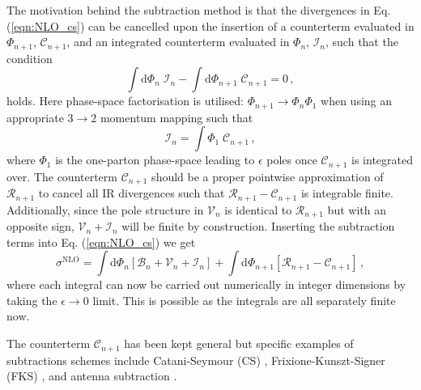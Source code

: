 \documentclass[main.tex]{subfiles}
\begin{document}
    The motivation behind the subtraction method is that the
    divergences in Eq. (\ref{eqn:NLO_cs}) can be cancelled upon the insertion
    of a counterterm evaluated in $\Phi_{n+1}$, $\mathcal{C}_{n+1}$,
    and an integrated counterterm evaluated in $\Phi_{n}$, $\mathcal{I}_{n}$,
    such that the condition
    \begin{equation}\label{eqn:subtraction_term_condition}
        \int \mathrm{d}\Phi_{n} \; \mathcal{I}_{n} - \int \mathrm{d}\Phi_{n+1} \; \mathcal{C}_{n+1} = 0 \, ,
    \end{equation}
    holds. Here phase-space factorisation is utilised:
    $\Phi_{n+1} \rightarrow \Phi_{n}\Phi_{1}$ when using
    an appropriate $3 \rightarrow 2$ momentum mapping \cite{Catani:1996vz,Kosower:2002su} such that
    \begin{equation}\label{eqn:integrated_counterterm}
        \mathcal{I}_{n} = \int \Phi_{1} \; \mathcal{C}_{n+1} \, ,
    \end{equation}
    where $\Phi_{1}$ is the one-parton phase-space leading
    to $\epsilon$ poles once $\mathcal{C}_{n+1}$ is integrated over.
    The counterterm $\mathcal{C}_{n+1}$ should be a proper
    pointwise approximation of $\mathcal{R}_{n+1}$ to cancel all IR
    divergences such that $\mathcal{R}_{n+1} - \mathcal{C}_{n+1}$ is integrable finite.
    Additionally, since the pole structure in $\mathcal{V}_{n}$ is identical
    to $\mathcal{R}_{n+1}$ but with an opposite sign, $\mathcal{V}_{n} + \mathcal{I}_{n}$ will be finite
    by construction.
    Inserting the subtraction terms into Eq. (\ref{eqn:NLO_cs}) we get
    \begin{equation}\label{eqn:NLO_subtraction}
        \sigma^{\mathrm{NLO}} = \int \mathrm{d}\Phi_{n} \left[\mathcal{B}_{n} + \mathcal{V}_{n} + \mathcal{I}_{n}\right] + \int \mathrm{d}\Phi_{n+1} \left[\mathcal{R}_{n+1} - \mathcal{C}_{n+1}\right] \, ,
    \end{equation}
    where each integral can now be carried out numerically
    in integer dimensions by taking the $\epsilon \rightarrow 0$
    limit. This is possible as the integrals are all separately
    finite now.

    The counterterm $\mathcal{C}_{n+1}$ has been kept general
    but specific examples of subtractions schemes include
    Catani-Seymour (CS) \cite{Catani:1996vz,Catani:2002hc},
    Frixione-Kunszt-Signer (FKS) \cite{Frixione:1995ms,Frixione:1997np},
    and antenna subtraction \cite{Campbell:1998nn,Kosower:1997zr,Kosower:2003bh}.
\end{document}
